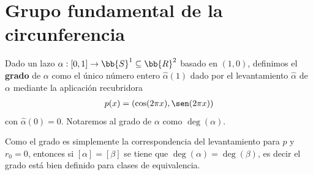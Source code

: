 \section{Grupo fundamental de la circunferencia}

\begin{definicion}
    Dado un lazo $\alpha:[0,1]\to \bb{S}^1 \subseteq \bb{R}^2$ basado en $(1,0)$, definimos el \textbf{grado} de $\alpha$ como el único número entero $\hat{\alpha}(1)$ dado por el levantamiento $\hat{\alpha}$ de $\alpha$ mediante la aplicación recubridora
    \begin{gather*}
        p(x) = (\cos(2\pi x), \sen(2\pi x))
    \end{gather*}
    con $\hat{\alpha}(0) = 0$. Notaremos al grado de $\alpha$ como $\deg(\alpha)$.
\end{definicion}

\begin{observacion}
    Como el grado es simplemente la correspondencia del levantamiento para $p$ y $r_0=0$, entonces si $[\alpha]=[\beta]$ se tiene que $\deg(\alpha)=\deg(\beta)$, es decir el grado está bien definido para clases de equivalencia.
\end{observacion}

